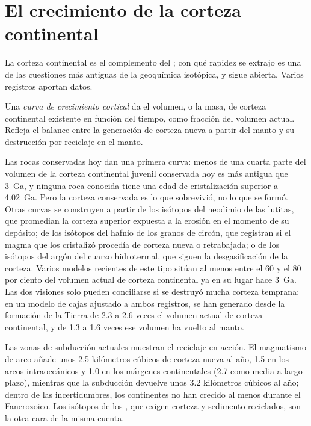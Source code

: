 \section{El crecimiento de la corteza continental}

La corteza continental es el complemento del ; con qué rapidez se
extrajo es una de las cuestiones más antiguas de la geoquímica isotópica, y sigue
abierta. Varios registros aportan datos.

\begin{definition}\label{def:b2:isotope-geochemistry:growth}
Una \emph{curva de crecimiento cortical} da el volumen, o
la masa, de corteza continental existente en función del tiempo, como fracción del
volumen actual. Refleja el balance entre la generación de corteza nueva
a partir del manto y su destrucción por reciclaje en el manto.
\end{definition}

Las rocas conservadas hoy dan una primera curva: menos de una cuarta parte del volumen
de la corteza continental juvenil conservada hoy es más antigua que \qty{3}{Ga}, y
ninguna roca conocida tiene una edad de cristalización superior a \qty{4.02}{Ga}. Pero la
corteza conservada es lo que sobrevivió, no lo que se formó. Otras curvas se construyen a partir de
los isótopos del neodimio de las lutitas, que promedian la corteza superior expuesta a la
erosión en el momento de su depósito; de los isótopos del hafnio de los granos de
circón, que registran si el magma que los cristalizó procedía de corteza nueva o
retrabajada; o de los isótopos del argón del cuarzo hidrotermal, que siguen
la desgasificación de la corteza. Varios modelos recientes de este tipo sitúan al menos entre el 60
y el 80 por ciento del volumen actual de corteza continental ya en su lugar hace
\qty{3}{Ga}. Las dos visiones solo pueden conciliarse si se destruyó mucha corteza
temprana: en un modelo de cajas ajustado a ambos registros, se han generado desde la formación de la Tierra de 2.3 a 2.6 veces el
volumen actual de corteza continental,
y de 1.3 a 1.6 veces ese volumen ha vuelto al manto.

Las zonas de subducción actuales muestran el reciclaje en acción. El magmatismo de arco añade
unos 2.5 kilómetros cúbicos de corteza nueva al año, 1.5 en los arcos intraoceánicos y
1.0 en los márgenes continentales (2.7 como media a largo plazo), mientras que la subducción
devuelve unos 3.2 kilómetros cúbicos al año; dentro de las incertidumbres, los
continentes no han crecido al menos durante el Fanerozoico. Los isótopos de los , que exigen corteza y sedimento reciclados, son la otra cara de
la misma cuenta.


